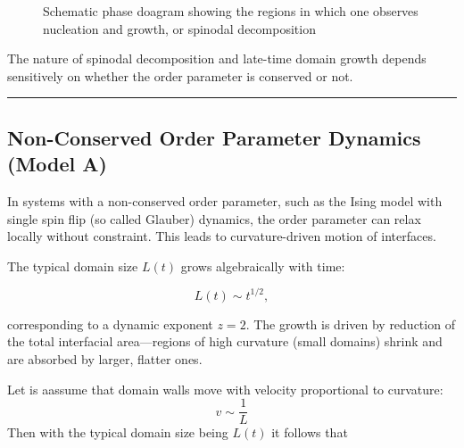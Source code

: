 \documentclass[
  letterpaper,
  enabledeprecatedfontcommands]{report}
\begin{document}
\begin{figure}


\caption{\label{fig-spinodal}Schematic phase doagram showing the regions
in which one observes nucleation and growth, or spinodal decomposition}

\end{figure}%

The nature of spinodal decomposition and late-time domain growth depends
sensitively on whether the order parameter is conserved or not.

\begin{center}\rule{0.5\linewidth}{0.5pt}\end{center}

\subsection{Non-Conserved Order Parameter Dynamics (Model
A)}\label{non-conserved-order-parameter-dynamics-model-a}

In systems with a non-conserved order parameter, such as the Ising model
with single spin flip (so called Glauber) dynamics, the order parameter
can relax locally without constraint. This leads to curvature-driven
motion of interfaces.

The typical domain size \(L(t)\) grows algebraically with time:

\[
L(t) \sim t^{1/2},
\]

corresponding to a dynamic exponent \(z = 2\). The growth is driven by
reduction of the total interfacial area---regions of high curvature
(small domains) shrink and are absorbed by larger, flatter ones.

Let is aassume that domain walls move with velocity proportional to
curvature: \[
  v \sim \frac{1}{L}
  \] Then with the typical domain size being \(L(t)\) it follows that
\end{document}
